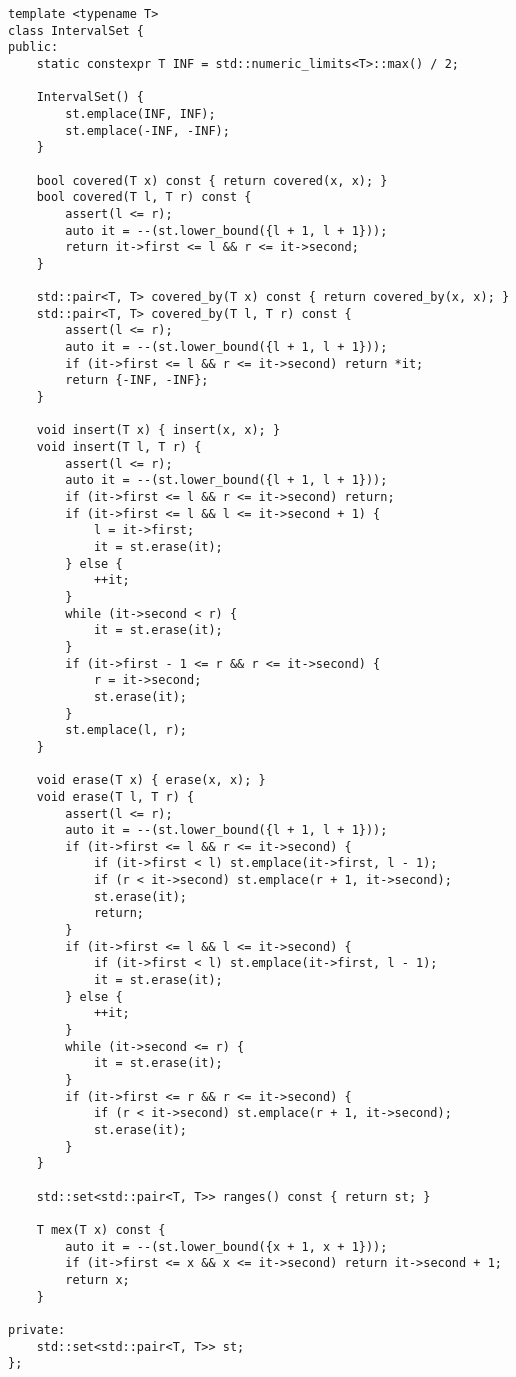 \begin{lstlisting}
template <typename T>
class IntervalSet {
public:
    static constexpr T INF = std::numeric_limits<T>::max() / 2;

    IntervalSet() {
        st.emplace(INF, INF);
        st.emplace(-INF, -INF);
    }

    bool covered(T x) const { return covered(x, x); }
    bool covered(T l, T r) const {
        assert(l <= r);
        auto it = --(st.lower_bound({l + 1, l + 1}));
        return it->first <= l && r <= it->second;
    }

    std::pair<T, T> covered_by(T x) const { return covered_by(x, x); }
    std::pair<T, T> covered_by(T l, T r) const {
        assert(l <= r);
        auto it = --(st.lower_bound({l + 1, l + 1}));
        if (it->first <= l && r <= it->second) return *it;
        return {-INF, -INF};
    }

    void insert(T x) { insert(x, x); }
    void insert(T l, T r) {
        assert(l <= r);
        auto it = --(st.lower_bound({l + 1, l + 1}));
        if (it->first <= l && r <= it->second) return;
        if (it->first <= l && l <= it->second + 1) {
            l = it->first;
            it = st.erase(it);
        } else {
            ++it;
        }
        while (it->second < r) {
            it = st.erase(it);
        }
        if (it->first - 1 <= r && r <= it->second) {
            r = it->second;
            st.erase(it);
        }
        st.emplace(l, r);
    }

    void erase(T x) { erase(x, x); }
    void erase(T l, T r) {
        assert(l <= r);
        auto it = --(st.lower_bound({l + 1, l + 1}));
        if (it->first <= l && r <= it->second) {
            if (it->first < l) st.emplace(it->first, l - 1);
            if (r < it->second) st.emplace(r + 1, it->second);
            st.erase(it);
            return;
        }
        if (it->first <= l && l <= it->second) {
            if (it->first < l) st.emplace(it->first, l - 1);
            it = st.erase(it);
        } else {
            ++it;
        }
        while (it->second <= r) {
            it = st.erase(it);
        }
        if (it->first <= r && r <= it->second) {
            if (r < it->second) st.emplace(r + 1, it->second);
            st.erase(it);
        }
    }

    std::set<std::pair<T, T>> ranges() const { return st; }

    T mex(T x) const {
        auto it = --(st.lower_bound({x + 1, x + 1}));
        if (it->first <= x && x <= it->second) return it->second + 1;
        return x;
    }

private:
    std::set<std::pair<T, T>> st;
};
\end{lstlisting}

